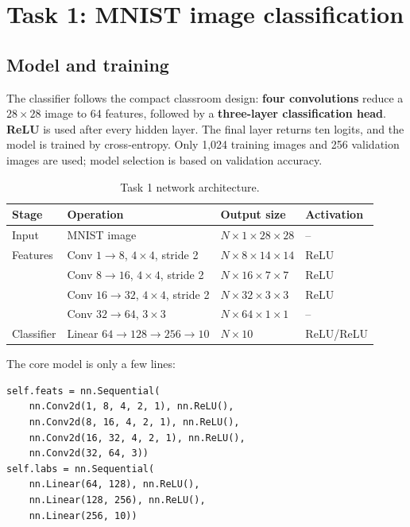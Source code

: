 \documentclass[11pt]{article}
\newcommand{\keyarch}[1]{\textcolor{codeblue}{\textbf{#1}}}
\begin{document}
\section{Task 1: MNIST image classification}

\subsection{Model and training}

The classifier follows the compact classroom design: \keyarch{four convolutions} reduce a $28\times28$ image to 64 features, followed by a \keyarch{three-layer classification head}. \keyarch{ReLU} is used after every hidden layer. The final layer returns ten logits, and the model is trained by cross-entropy. Only 1,024 training images and 256 validation images are used; model selection is based on validation accuracy.

\begin{table}[H]
\centering
\caption{Task 1 network architecture.}
\begin{tabular}{llll}
\toprule
Stage & Operation & Output size & Activation \\
\midrule
Input & MNIST image & $N\times1\times28\times28$ & -- \\
Features & Conv $1\rightarrow8$, $4\times4$, stride 2 & $N\times8\times14\times14$ & ReLU \\
 & Conv $8\rightarrow16$, $4\times4$, stride 2 & $N\times16\times7\times7$ & ReLU \\
 & Conv $16\rightarrow32$, $4\times4$, stride 2 & $N\times32\times3\times3$ & ReLU \\
 & Conv $32\rightarrow64$, $3\times3$ & $N\times64\times1\times1$ & -- \\
Classifier & Linear $64\rightarrow128\rightarrow256\rightarrow10$ & $N\times10$ & ReLU/ReLU \\
\bottomrule
\end{tabular}
\end{table}

The core model is only a few lines:
\begin{lstlisting}
self.feats = nn.Sequential(
    nn.Conv2d(1, 8, 4, 2, 1), nn.ReLU(),
    nn.Conv2d(8, 16, 4, 2, 1), nn.ReLU(),
    nn.Conv2d(16, 32, 4, 2, 1), nn.ReLU(),
    nn.Conv2d(32, 64, 3))
self.labs = nn.Sequential(
    nn.Linear(64, 128), nn.ReLU(),
    nn.Linear(128, 256), nn.ReLU(),
    nn.Linear(256, 10))
\end{lstlisting}
\end{document}
